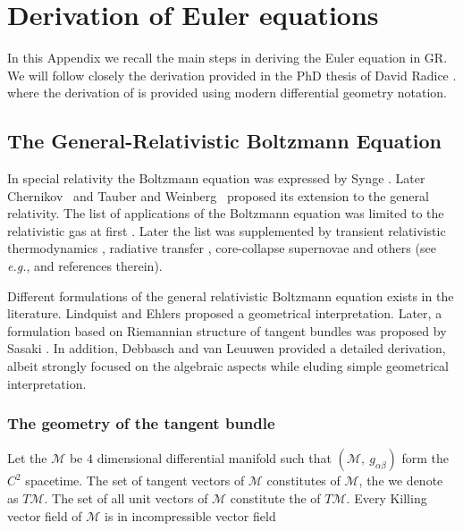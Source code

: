 
\chapter{Derivation of Euler equations}
\label{app:eul}

In this Appendix we recall the main steps in deriving the Euler equation 
in \ac{GR}. 
We will follow closely the derivation provided in the PhD thesis of David Radice \citep{Radice:2013apa}. 
where the derivation of is provided using modern differential geometry notation.



\section{The General-Relativistic Boltzmann Equation}

In special relativity the Boltzmann equation was expressed by Synge \citep{Synge:1957}. 
Later Chernikov~\citep{Chernikov:1962} and Tauber and Weinberg~\citep{Tauber:1961} 
proposed its extension to the general relativity. 
The list of applications of the Boltzmann equation was limited to the relativistic gas at first \citep{Israel:1963}. 
Later the list was supplemented by 
transient relativistic thermodynamics \citep{Israel:1979wp}, 
radiative transfer \citep{Lindquist:1966}, 
core-collapse supernovae \citep{Bruenn:1985} and others (see \textit{e.g.}, \cite{Cercignani:2002} and references therein). 

Different formulations of the general relativistic Boltzmann equation exists in the literature. 
Lindquist \citep{Lindquist:1966} and Ehlers \citep{Ehlers:1971} proposed a geometrical interpretation. 
Later, a formulation based on Riemannian structure of tangent bundles was proposed by Sasaki \citep{Sasaki:1958,Sasaki:1962}. 
In addition, Debbasch and van Leuuwen \citep{Debbasch:2009a,Debbasch:2009b} provided a detailed derivation, 
albeit strongly focused on the algebraic aspects while eluding simple geometrical interpretation.



\subsection{The geometry of the tangent bundle}
%
Let the $\mathcal{M}$ be $4$ dimensional differential manifold such that 
$(\mathcal{M},\: g_{\alpha\beta})$ form the $C^2$ spacetime. 
The set of tangent vectors of $\mathcal{M}$ constitutes  of $\mathcal{M}$, 
the we denote as $T\mathcal{M}$. 
The set of all unit vectors of $\mathcal{M}$ constitute the  of $T\mathcal{M}$. 
%
Every Killing vector field of $\mathcal{M}$ is in incompressible vector field

